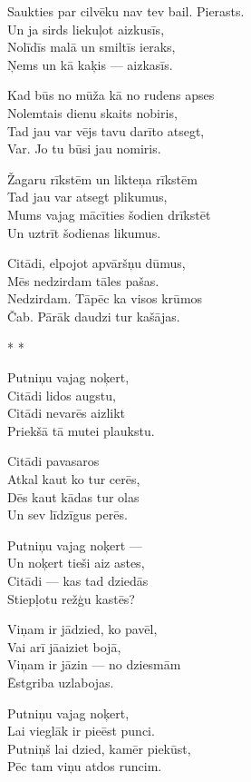 \documentclass[14pt]{extarticle}
\begin{document}
Saukties par cilvēku nav tev bail. Pierasts.\\
Un ja sirds liekuļot aizkusīs,\\
Nolīdīs malā un smiltīs ieraks,\\
Ņems un kā kaķis --- aizkasīs.

Kad būs no mūža kā no rudens apses\\
Nolemtais dienu skaits nobiris,\\
Tad jau var vējs tavu darīto atsegt,\\
Var. Jo tu būsi jau nomiris.

Žagaru rīkstēm un likteņa rīkstēm\\
Tad jau var atsegt plikumus,\\
Mums vajag mācīties šodien drīkstēt\\
Un uztrīt šodienas likumus.

Citādi, elpojot apvāršņu dūmus,\\
Mēs nedzirdam tāles pašas.\\
Nedzirdam. Tāpēc ka visos krūmos\\
Čab. Pārāk daudzi tur kašājas.


\newpage

{\large \sc * * *}

Putniņu vajag noķert,\\
Citādi lidos augstu,\\
Citādi nevarēs aizlikt\\
Priekšā tā mutei plaukstu.

Citādi pavasaros\\
Atkal kaut ko tur cerēs,\\
Dēs kaut kādas tur olas\\
Un sev līdzīgus perēs.

Putniņu vajag noķert ---\\
Un noķert tieši aiz astes,\\
Citādi --- kas tad dziedās\\
Stiepļotu režģu kastēs?

Viņam ir jādzied, ko pavēl,\\
Vai arī jāaiziet bojā,\\
Viņam ir jāzin --- no dziesmām\\
Ēstgriba uzlabojas.

Putniņu vajag noķert,\\
Lai vieglāk ir pieēst punci.\\
Putniņš lai dzied, kamēr piekūst,\\
Pēc tam viņu atdos runcim.
\end{document}
